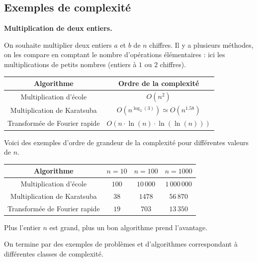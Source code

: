 \documentclass[11pt,class=report,crop=false]{standalone}
\begin{document}
  
\subsection{Exemples de complexité}

\textbf{Multiplication de deux entiers.}

On souhaite multiplier deux entiers $a$ et $b$ de $n$ chiffres.
Il y a plusieurs méthodes, on les compare en comptant le nombre d'opérations élémentaires : ici les multiplications de petits nombres (entiers à $1$ ou $2$ chiffres).

\begin{center}
	\begin{tabular}{|c|c|}\hline
		Algorithme  & Ordre de la complexité \\ \hline\hline
		Multiplication d'école & $O(n^2)$ \\ \hline
		Multiplication de Karatsuba & $O(n^{\log_2(3)}) \simeq O(n^{1.58})$  \\ \hline
		Transformée de Fourier rapide & $O(n\cdot \ln(n) \cdot \ln(\ln(n)))$  \\\hline
	\end{tabular}
\end{center}  

Voici des exemples d'ordre de grandeur de la complexité pour différentes valeurs de $n$.
\begin{center}
	\begin{tabular}{|c|c|c|c|}\hline
		Algorithme  & $n=10$ & $n=100$ & $n=1000$  \\ \hline\hline
		Multiplication d'école & $100$ & $10\,000$ & $1\,000\,000$ \\ \hline
		Multiplication de Karatsuba & $38$ & $1478$ &  $56\,870$ \\ \hline
		Transformée de Fourier rapide & $19$ & $703$ & $13\,350$   \\\hline
	\end{tabular}
\end{center} 

Plus l'entier $n$ est grand, plus un bon algorithme prend l'avantage.

\bigskip

On termine par des exemples de problèmes et d'algorithmes correspondant à différentes classes de complexité.
\end{document}
